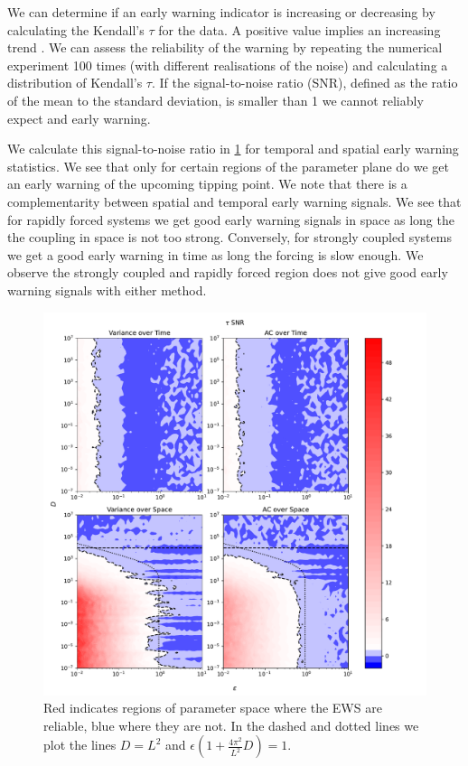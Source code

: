    We can determine if an early warning indicator is increasing or decreasing by calculating the Kendall's $\tau$ for the data.
    A positive value implies an increasing trend \parencite{Wilks2011}. We can assess the reliability of the warning by repeating the numerical
    experiment 100 times (with different realisations of the noise) and calculating a distribution of Kendall's $\tau$. If the signal-to-noise ratio
    (SNR), defined as the ratio of the mean to the standard deviation, is smaller than 1 we cannot reliably expect and early warning.

    We calculate this signal-to-noise ratio in \cref{fig:parameter_plane} for temporal and spatial early warning statistics. We see that only for
    certain regions of the parameter plane do we get an early warning of the upcoming tipping point. We note that there is a complementarity between spatial
    and temporal early warning signals. We see that for rapidly forced systems we get good early warning signals in space as long the
    the coupling in space is not too strong. Conversely, for strongly coupled systems we get 
    a good early warning in time as long the forcing is slow enough. We observe the strongly
    coupled and rapidly forced region does not give good early warning signals with either method.

    \begin{figure}
      \centering
      \includegraphics[width=\textwidth,keepaspectratio]{parameter_plane}
      \caption[The quality of early warning signals in the $\epsilon$ and $D$ plane]{Red indicates regions of parameter space where the EWS are reliable, blue
        where they are not. In the dashed and dotted lines we plot the lines $D=L^2$ and
        $\epsilon(1+\frac{4\pi^2}{L^2} D) = 1$.}
      \label{fig:parameter_plane}
    \end{figure}
